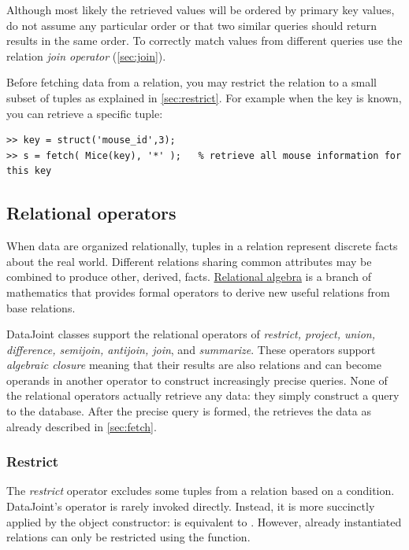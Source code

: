 \documentclass[10pt]{article}
\begin{document}
Although most likely the retrieved values will be ordered by primary key values, do not assume any particular order or that two similar queries should return results in the same order.  To correctly match values from different queries use the relation \emph{join operator} (\autoref{sec:join}).

Before fetching data from a relation, you may restrict the relation to a small subset of tuples as explained in \autoref{sec:restrict}. For example when the key is known, you can retrieve a specific tuple: 
\begin{lstlisting}
>> key = struct('mouse_id',3);
>> s = fetch( Mice(key), '*' );   % retrieve all mouse information for this key 
\end{lstlisting}


\subsection{Relational operators}\label{sec:operators}
When data are organized relationally, tuples in a relation represent discrete facts about the real world.   Different relations sharing common attributes may be combined to produce other, derived, facts.  \href{http://en.wikipedia.org/wiki/Relational_algebra}{Relational algebra} is a branch of mathematics that provides formal operators to derive new useful relations from base relations.   

DataJoint classes support the relational operators of {\em restrict, project, union, difference, semijoin, antijoin, join}, and {\em summarize}.  These operators support {\em algebraic closure} meaning that their results are also relations and can become operands in another operator to construct increasingly precise queries. None of the relational operators actually retrieve any data: they simply construct a query to the database.  After the precise query is formed, the  retrieves the data as already described in \autoref{sec:fetch}.

\subsubsection{Restrict}\label{sec:restrict}
The {\em restrict} operator excludes some tuples from a relation based on a condition.  DataJoint's  operator is rarely invoked directly. Instead, it is more succinctly applied by the object constructor:   is equivalent to .  However, already instantiated relations can only be restricted using the  function. 
\end{document}

